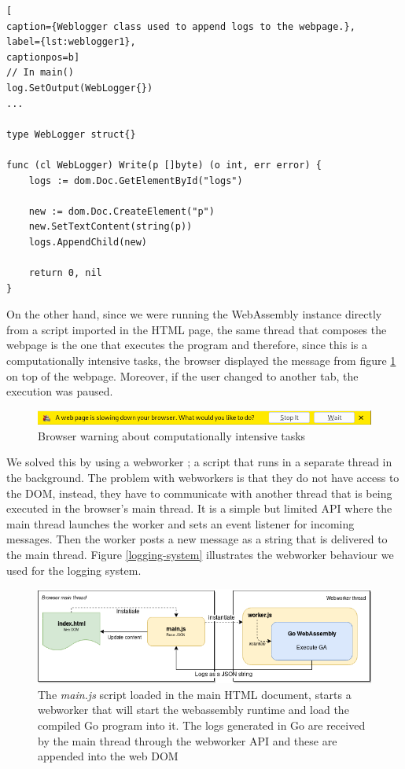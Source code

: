\begin{lstlisting}[
caption={Weblogger class used to append logs to the webpage.},
label={lst:weblogger1},
captionpos=b]
// In main()
log.SetOutput(WebLogger{})
...

type WebLogger struct{}

func (cl WebLogger) Write(p []byte) (o int, err error) {
	logs := dom.Doc.GetElementById("logs")

	new := dom.Doc.CreateElement("p")
	new.SetTextContent(string(p))
	logs.AppendChild(new)

	return 0, nil
}
\end{lstlisting} 

On the other hand, since we were running the WebAssembly instance directly from a script imported in the HTML page, the same thread that composes the webpage is the one that executes the program and therefore, since this is a computationally intensive tasks, the browser displayed the message from figure \ref{image:kill-task} on top of the webpage. Moreover, if the user changed to another tab, the execution was paused.

\begin{figure}[h!]
		\centering
    	\includegraphics[width=\linewidth]{assets/images/browser-warning.png}
    	\caption{Browser warning about computationally intensive tasks}
    	\label{image:kill-task}
\end{figure} 

We solved this by using a webworker \cite{webworker}; a script that runs in a separate thread in the background. The problem with webworkers is that they do not have access to the DOM, instead, they have to communicate with another thread that is being executed in the browser's main thread. It is a simple but limited API where the main thread launches the worker and sets an event listener for incoming messages. Then the worker posts a new message as a string that is delivered to the main thread. Figure \ref{logging-system} illustrates the webworker behaviour we used for the logging system.

\begin{figure}[h!]
		\centering
    	\includegraphics[width=\linewidth]{assets/images/logging-system.png}
    	\caption{The \textit{main.js} script loaded in the main HTML document, starts a webworker that will start the webassembly runtime and load the compiled Go program into it. The logs generated in Go are received by the main thread through the webworker API and these are appended into the web DOM}
    	\label{image:logging-system}
\end{figure} 

